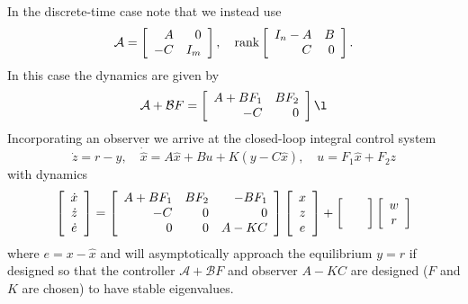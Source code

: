 \documentclass{report}
\begin{document}
In the discrete-time case note that we instead use
$$
\mathcal{A} =
\left[\begin{array}{r r}
 A & 0    \\
-C & I_m
\end{array}\right], \quad
\mathrm{rank}
\left[\begin{array}{r r}
I_n - A & B \\
    C   & 0
\end{array}\right].
$$
In this case the dynamics are given by
$$
\mathcal{A} + \mathcal{B} F =
\left[\begin{array}{r r}
  A + BF_1 & BF_2 \\
  -C       & 0
\end{array}\right]
\l
$$
Incorporating an observer we arrive at the closed-loop integral
control system
$$
\dot{z} = r - y, \quad
\dot{\hat{x}} = A \hat{x} + B u + K (y - C \hat{x}), \quad
u = F_1 \hat{x} + F_2 z
$$
with dynamics
$$
\left[\begin{array}{c}
  \dot{x} \\
  \dot{z} \\
  \dot{e}
\end{array}\right] =
\left[\begin{array}{r r r}
  A + B F_1 & B F_2 & -B F_1 \\
  -C        & 0     &  0     \\
   0        & 0     &  A - K C
\end{array}\right]
\left[\begin{array}{c}
  x \\
  z \\
  e
\end{array}\right]
+
\left[\begin{array}{c}
  \quad \\
  \quad
\end{array}\right]
\left[\begin{array}{c}
  w \\
  r
\end{array}\right]
$$
where $e = x - \hat{x}$
and will asymptotically approach the equilibrium $y = r$ if designed
so that the controller $\mathcal{A} + \mathcal{B} F$ and
observer $A - K C$ are designed ($F$ and $K$ are chosen) to have
stable eigenvalues.
\end{document}

